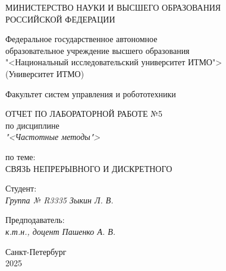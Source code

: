 \thispagestyle{empty}

\begin{center}
    МИНИСТЕРСТВО НАУКИ И ВЫСШЕГО ОБРАЗОВАНИЯ \\ РОССИЙСКОЙ ФЕДЕРАЦИИ

    \vspace{20pt}

    Федеральное государственное автономное \\ образовательное учреждение высшего образования \\
    "<Национальный исследовательский университет ИТМО"> \\
    (Университет ИТМО)

    \vspace{20pt}

    Факультет систем управления и робототехники
\end{center}

\vfill

\begin{center}
    ОТЧЕТ ПО ЛАБОРАТОРНОЙ РАБОТЕ №5\\  
    по дисциплине \\
    \textit{"<Частотные методы">}

    \vspace{20pt}

    по теме: \\
    \uppercase{Связь непрерывного и дискретного}
\end{center}

\vfill

    \noindent Студент: \\
    \textit{Группа № R3335 \hfill Зыкин Л. В.}

    \vspace{20pt}

    \noindent Предподаватель: \\
    \textit{к.т.н., доцент \hfill Пашенко А. В.}

\vfill

\begin{center}
    Санкт-Петербург \\ 2025
\end{center}